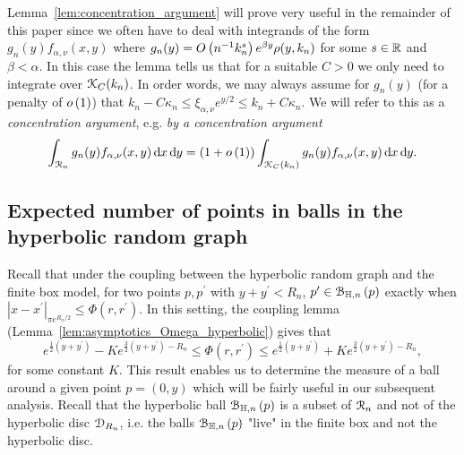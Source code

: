 \begin{remark}\label{rmk:concentration_argument}
Lemma~\ref{lem:concentration_argument} will prove very useful in the remainder of this paper since we often have to deal with integrands of the form $g_n(y) f_{\alpha,\nu}(x,y)$ where $g_n(y) = O\left(n^{-1} k_n^{s}\right)e^{\beta y}\rho(y,k_n)$ for some $s \in {\ensuremath{\mathbb R}}$ and $\beta < \alpha$. In this case the lemma tells us that for a suitable $C > 0$ we only need to integrate over ${\mathcal K}_C(k_n)$. In order words, we may always assume for $g_n(y)$ (for a penalty of $o\left(1\right)$) that $k_n - C \kappa_n \le \xi_{\alpha,\nu} e^{y/2} \le k_n + C \kappa_n$. We will refer to this as a \emph{concentration argument}, e.g. \emph{by a concentration argument}
\[
	\int_{{\mathcal R}_n} g_n(y) f_{\alpha, \nu}(x,y) \operatorname{\mathrm{d}\hspace{-2pt}} x \operatorname{\mathrm{d}\hspace{-2pt}} y 
	= (1+o\left(1\right)) \int_{{\mathcal K}_C(k_n)} g_n(y) f_{\alpha, \nu}(x,y) \operatorname{\mathrm{d}\hspace{-2pt}} x \operatorname{\mathrm{d}\hspace{-2pt}} y.
\]
\end{remark}

\subsection{Expected number of points in balls in the hyperbolic random graph}\label{ssec:average_degree_HP_n}

Recall that under the coupling between the hyperbolic random graph and the finite box model, for two points $p, p^\prime$ with $y + y^\prime < R_n$, $p^\prime \in {\mathcal B}_{\mathbb{H},n}\left(p\right)$ exactly when $|x-x^\prime|_{\pi e^{R_n/2}} \le \Phi(r,r^\prime)$. In this setting, the coupling lemma (Lemma~\ref{lem:asymptotics_Omega_hyperbolic}) gives that  
\[
	e^{\frac{1}{2}(y+y^\prime)} - K e^{\frac{3}{2}(y+y^\prime) - R_n} \leq \Phi(r, r^\prime) 
		\leq  e^{\frac{1}{2}(y+y^\prime)} + K e^{\frac{3}{2}(y+y^\prime) - R_n},
\]
for some constant $K$. %
This result enables us to determine the measure of a ball around a given point $p=(0,y)$ which will be fairly useful in our subsequent analysis. Recall that the hyperbolic ball ${\mathcal B}_{\mathbb{H},n}\left(p\right)$ is a subset of ${\mathcal R}_n$ and not of the hyperbolic disc ${\mathcal D}_{R_n}$, i.e. the balls ${\mathcal B}_{\mathbb{H},n}\left(p\right)$ "live" in the finite box and not the hyperbolic disc.

